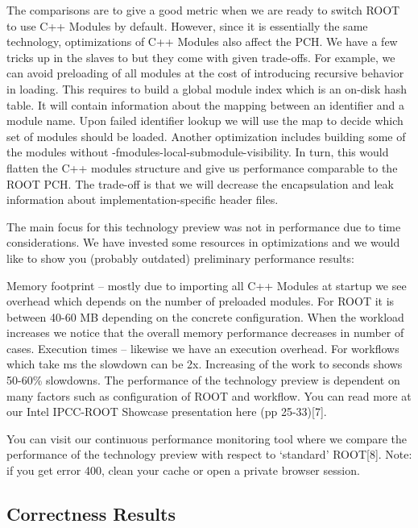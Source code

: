 \documentclass{webofc}
\begin{document}
The comparisons are to give a good metric when we are ready to switch ROOT to use C++ Modules by default. However, since it is essentially the same technology, optimizations of C++ Modules also affect the PCH. We have a few tricks up in the slaves to but they come with given trade-offs. For example, we can avoid preloading of all modules at the cost of introducing recursive behavior in loading. This requires to build a global module index which is an on-disk hash table. It will contain information about the mapping between an identifier and a module name. Upon failed identifier lookup we will use the map to decide which set of modules should be loaded. Another optimization includes building some of the modules without -fmodules-local-submodule-visibility.
In turn, this would flatten the C++ modules structure and give us performance comparable to the ROOT PCH. The trade-off is that we will decrease the encapsulation and leak information about implementation-specific header files.

The main focus for this technology preview was not in performance due to time considerations. We have invested some resources in optimizations and we would like to show you (probably outdated) preliminary performance
results:

Memory footprint – mostly due to importing all C++ Modules at startup
we see overhead which depends on the number of preloaded modules. For
ROOT it is between 40-60 MB depending on the concrete configuration.
When the workload increases we notice that the overall memory performance
decreases in number of cases.
Execution times – likewise we have an execution overhead. For
workflows which take ms the slowdown can be 2x. Increasing of the work
to seconds shows 50-60\% slowdowns.
The performance of the technology preview is dependent on many factors such
as configuration of ROOT and workflow. You can read more at our Intel
IPCC-ROOT Showcase presentation here (pp 25-33)[7].

You can visit our continuous performance monitoring tool where we compare
the performance of the technology preview with respect to ‘standard’ ROOT[8].
Note: if you get error 400, clean your cache or open a private browser session.

\subsection{Correctness Results}
\label{correctness}
\end{document}
